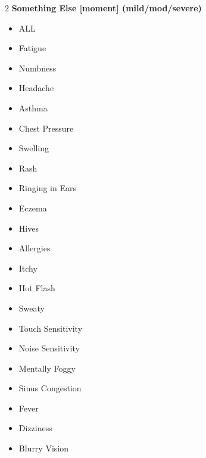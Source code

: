 \begin{multicols}{2}
  \textbf{Something Else [moment] (mild/mod/severe)}
  \begin{itemize}
    \item ALL
    \item Fatigue
    \item Numbness
    \item Headache
    \item Asthma
    \item Chest Pressure
    \item Swelling
    \item Rash
    \item Ringing in Ears
    \item Eczema
    \item Hives
    \item Allergies
    \item Itchy
    \item Hot Flash
    \item Sweaty
    \item Touch Sensitivity
    \item Noise Sensitivity
    \item Mentally Foggy
    \item Sinus Congestion
    \item Fever
    \item Dizziness
    \item Blurry Vision
  \end{itemize}


\end{multicols}
